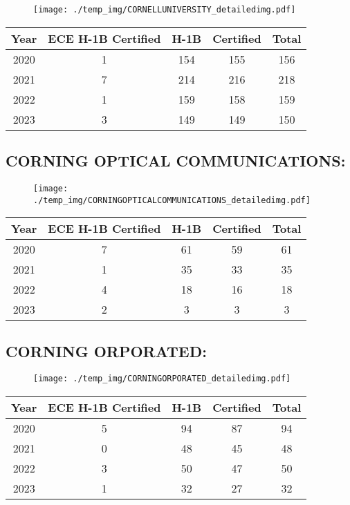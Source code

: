 \documentclass{article}%
\begin{document}
\begin{figure}[htbp]%
\centering%
\texttt{[image: ./temp\_img/CORNELLUNIVERSITY\_detailedimg.pdf]}%
\end{figure}

%
\begin{longtable}{c|c|c|c|c}%
\hline%
Year&ECE H{-}1B Certified&H{-}1B&Certified&Total\\%
\hline%
2020&1&154&155&156\\%
\hline%
2021&7&214&216&218\\%
\hline%
2022&1&159&158&159\\%
\hline%
2023&3&149&149&150\\%
\hline%
\end{longtable}

%
\newpage%
\subsection{CORNING OPTICAL COMMUNICATIONS:}%
\label{subsec:CORNINGOPTICALCOMMUNICATIONS}%
\label{CORNINGOPTICALCOMMUNICATIONSdetailed}%


\begin{figure}[htbp]%
\centering%
\texttt{[image: ./temp\_img/CORNINGOPTICALCOMMUNICATIONS\_detailedimg.pdf]}%
\end{figure}

%
\begin{longtable}{c|c|c|c|c}%
\hline%
Year&ECE H{-}1B Certified&H{-}1B&Certified&Total\\%
\hline%
2020&7&61&59&61\\%
\hline%
2021&1&35&33&35\\%
\hline%
2022&4&18&16&18\\%
\hline%
2023&2&3&3&3\\%
\hline%
\end{longtable}

%
\newpage%
\subsection{CORNING ORPORATED:}%
\label{subsec:CORNINGORPORATED}%
\label{CORNINGORPORATEDdetailed}%


\begin{figure}[htbp]%
\centering%
\texttt{[image: ./temp\_img/CORNINGORPORATED\_detailedimg.pdf]}%
\end{figure}

%
\begin{longtable}{c|c|c|c|c}%
\hline%
Year&ECE H{-}1B Certified&H{-}1B&Certified&Total\\%
\hline%
2020&5&94&87&94\\%
\hline%
2021&0&48&45&48\\%
\hline%
2022&3&50&47&50\\%
\hline%
2023&1&32&27&32\\%
\hline%
\end{longtable}
\end{document}

